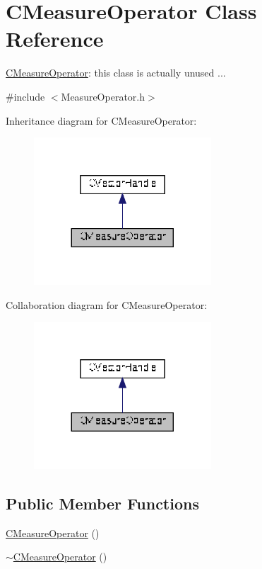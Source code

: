 \hypertarget{classCMeasureOperator}{}\section{C\+Measure\+Operator Class Reference}
\label{classCMeasureOperator}


\hyperlink{classCMeasureOperator}{C\+Measure\+Operator}\+: this class is actually unused ...  




{\ttfamily \#include $<$Measure\+Operator.\+h$>$}



Inheritance diagram for C\+Measure\+Operator\+:
\nopagebreak
\begin{figure}[H]
\begin{center}
\leavevmode
\includegraphics[width=188pt]{d4/dde/classCMeasureOperator__inherit__graph}
\end{center}
\end{figure}


Collaboration diagram for C\+Measure\+Operator\+:
\nopagebreak
\begin{figure}[H]
\begin{center}
\leavevmode
\includegraphics[width=188pt]{d2/dcf/classCMeasureOperator__coll__graph}
\end{center}
\end{figure}
\subsection*{Public Member Functions}
\begin{DoxyCompactItemize}
\item 
\hyperlink{classCMeasureOperator_abdf6e7568d2d9c5313299ff6b7a6012e}{C\+Measure\+Operator} ()
\item 
\hyperlink{classCMeasureOperator_acf2f26e41d5228767e4c098988cfaa89}{$\sim$\+C\+Measure\+Operator} ()
\end{DoxyCompactItemize}
